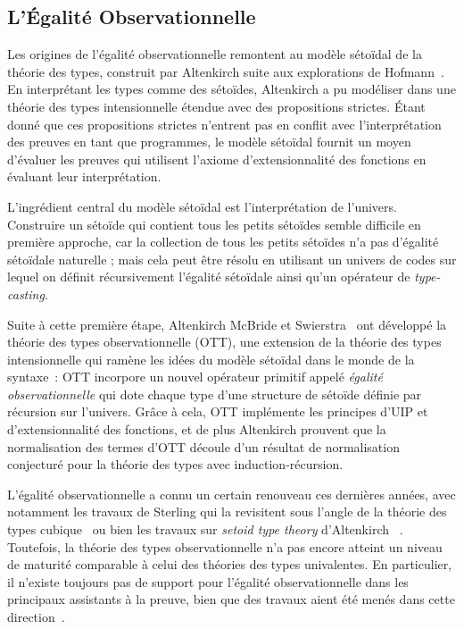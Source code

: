 \subsection{L'Égalité Observationnelle}

Les origines de l'égalité observationnelle remontent au modèle sétoïdal de la 
théorie des types, construit par Altenkirch suite aux explorations de 
Hofmann~\cite{hofmann95,altenkirch99}.
% 
En interprétant les types comme des sétoïdes, Altenkirch a pu modéliser
dans une théorie des types intensionnelle étendue avec des propositions strictes. 
Étant donné que ces propositions strictes n'entrent pas en conflit avec l'interprétation 
des preuves en tant que programmes, le modèle sétoïdal fournit un moyen d'évaluer les 
preuves qui utilisent l'axiome d'extensionnalité des fonctions en évaluant leur 
interprétation.

L'ingrédient central du modèle sétoïdal est l'interprétation de l'univers. 
% 
Construire un sétoïde qui contient tous les petits sétoïdes semble difficile 
en première approche, car la collection de tous les petits sétoïdes n'a pas 
d'égalité sétoïdale naturelle ; mais cela peut être résolu en utilisant un univers 
de codes sur lequel on définit récursivement l'égalité sétoïdale 
ainsi qu'un opérateur de \emph{type-casting}.

Suite à cette première étape, Altenkirch McBride et 
Swierstra~ ont développé la théorie des types 
observationnelle (OTT), une extension de la théorie des types intensionnelle 
qui ramène les idées du modèle sétoïdal dans le monde de la syntaxe~: 
% 
OTT incorpore un nouvel opérateur primitif appelé 
\emph{égalité observationnelle} qui dote chaque type d'une structure de sétoïde 
définie par récursion sur l'univers. 
% 
Grâce à cela, OTT implémente les principes d'UIP et d'extensionnalité des 
fonctions, et de plus Altenkirch \etal prouvent que la normalisation des termes 
d'OTT découle d'un résultat de normalisation conjecturé pour la théorie des types 
avec induction-récursion.

L'égalité observationnelle a connu un certain renouveau ces dernières années, 
avec notamment les travaux de Sterling \etal qui la revisitent sous l'angle 
de la théorie des types cubique~ ou bien
les travaux sur \emph{setoid type theory} d'Altenkirch \etal~. 
% 
Toutefois, la théorie des types observationnelle n'a pas encore atteint un niveau 
de maturité comparable à celui des théories des types univalentes. 
% 
En particulier, il n'existe toujours pas de support pour l'égalité 
observationnelle dans les principaux assistants à la preuve, bien que des
travaux aient été menés dans cette direction~.

